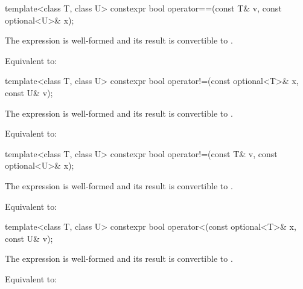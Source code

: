 %
\begin{itemdecl}
template<class T, class U> constexpr bool operator==(const T& v, const optional<U>& x);
\end{itemdecl}

\begin{itemdescr}
\pnum
\constraints
The expression  is well-formed and
its result is convertible to .

\pnum
\effects
Equivalent to: 
\end{itemdescr}

%
\begin{itemdecl}
template<class T, class U> constexpr bool operator!=(const optional<T>& x, const U& v);
\end{itemdecl}

\begin{itemdescr}
\pnum
\constraints
The expression  is well-formed and
its result is convertible to .

\pnum
\effects
Equivalent to: 
\end{itemdescr}

%
\begin{itemdecl}
template<class T, class U> constexpr bool operator!=(const T& v, const optional<U>& x);
\end{itemdecl}

\begin{itemdescr}
\pnum
\constraints
The expression  is well-formed and
its result is convertible to .

\pnum
\effects
Equivalent to: 
\end{itemdescr}

%
\begin{itemdecl}
template<class T, class U> constexpr bool operator<(const optional<T>& x, const U& v);
\end{itemdecl}

\begin{itemdescr}
\pnum
\constraints
The expression  is well-formed and
its result is convertible to .

\pnum
\effects
Equivalent to: 
\end{itemdescr}

